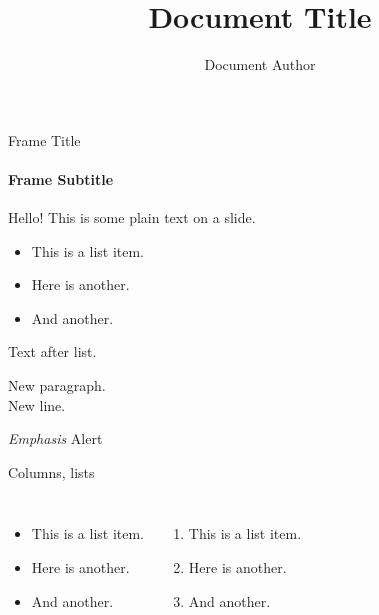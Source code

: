 \documentclass[titlebar,fancyfoot,11pt]{khbeamer}
\title{Document Title}
\author{Document Author}
\begin{document}
\begin{frame}
\titlepage
\end{frame}


\begin{frame}{Frame Title}
\framesubtitle{Frame Subtitle}

Hello! This is some plain text on a slide.

\begin{itemize}
\item This is a list item.
\item Here is another.
\item And another.
\end{itemize}

Text after list.

New paragraph.
\\ New line.

\emph{Emphasis} \quad {} \quad \alert{Alert} \quad {}

 \quad {} \quad {} \quad {} \quad {}
\end{frame}


\begin{frame}{Columns, lists}
\begin{columns}
\begin{itemize}
\item This is a list item.
\item Here is another.
\item And another.
\end{itemize}

\begin{enumerate}
\item This is a list item.
\item Here is another.
\item And another.
\end{enumerate}
\end{columns}

\end{frame}
\end{document}
